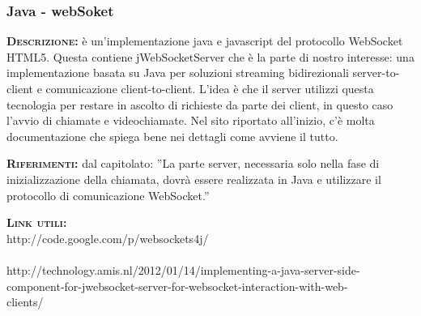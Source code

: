 \subsubsection{Java - webSoket}
\begin{description}
	\item{\scshape\bfseries Descrizione:} è un'implementazione java e javascript del protocollo WebSocket HTML5. Questa contiene jWebSocketServer che è la parte di nostro interesse: una implementazione basata su Java per soluzioni streaming bidirezionali server-to-client e comunicazione client-to-client. L'idea è che il server utilizzi questa tecnologia per restare in ascolto di richieste da parte dei client, in questo caso l'avvio di chiamate e videochiamate. Nel sito riportato all'inizio, c'è molta documentazione che spiega bene nei dettagli come avviene il tutto.

	\item{\scshape\bfseries Riferimenti:} dal capitolato: ''La parte server, necessaria solo nella fase di inizializzazione della chiamata, dovrà essere realizzata in Java e utilizzare il protocollo di comunicazione WebSocket.''

	\item{\scshape\bfseries Link utili:} \\http://code.google.com/p/websockets4j/
\\\\http://technology.amis.nl/2012/01/14/implementing-a-java-server-side-\\component-for-jwebsocket-server-for-websocket-interaction-with-web-\\clients/
			  
\end{description}

